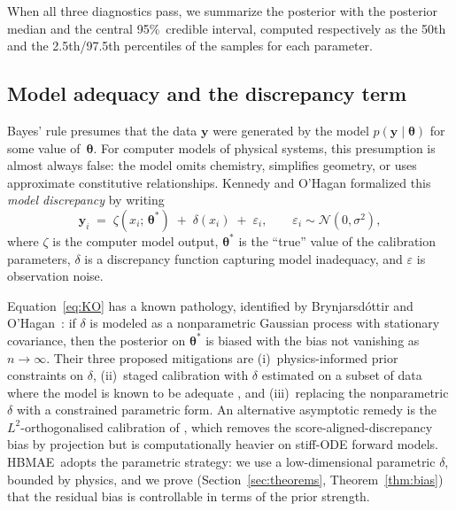 \documentclass[12pt]{article}
\theoremstyle{plain}
\theoremstyle{definition}
\theoremstyle{remark}
\newcommand{\HBMAE}{HBMAE\xspace}
\begin{document}
When all three diagnostics pass, we summarize the posterior with the
posterior median and the central 95\%~credible interval, computed
respectively as the 50th and the 2.5th/97.5th percentiles of the samples for
each parameter.

\subsection{Model adequacy and the discrepancy term}\label{sec:bg:adequacy}

Bayes' rule presumes that the data $\mathbf{y}$ were generated by the model
$p(\mathbf{y}\mid\boldsymbol{\theta})$ for some value of~$\boldsymbol{\theta}$.
For computer models of physical systems, this presumption is almost always
false:  the model omits chemistry, simplifies geometry, or uses approximate
constitutive relationships.  Kennedy and O'Hagan formalized this
\emph{model discrepancy} \citep{KennedyOHagan2001} by writing
%
\begin{equation}
  \mathbf{y}_i \;=\; \zeta(x_i;\,\boldsymbol{\theta}^*) \;+\;
              \delta(x_i) \;+\; \varepsilon_i,
  \qquad \varepsilon_i \sim \mathcal{N}(0,\sigma^2),
  \label{eq:KO}
\end{equation}
%
where $\zeta$ is the computer model output, $\boldsymbol{\theta}^*$ is the
``true'' value of the calibration parameters, $\delta$ is a discrepancy
function capturing model inadequacy, and $\varepsilon$ is observation noise.

Equation~\eqref{eq:KO} has a known pathology, identified by Brynjarsd\'ottir
and O'Hagan~\citep{Brynjarsdottir2014}:  if $\delta$ is modeled as a
nonparametric Gaussian process with stationary covariance, then the
posterior on $\boldsymbol{\theta}^*$ is biased with the bias not vanishing
as $n\to\infty$.  Their three proposed mitigations are (i)~physics-informed
prior constraints on $\delta$, (ii)~staged calibration with $\delta$
estimated on a subset of data where the model is known to be adequate
\citep{Vollmer2009,Plumlee2017}, and
(iii)~replacing the nonparametric $\delta$ with a constrained parametric
form.  An alternative asymptotic remedy is the $L^2$-orthogonalised
calibration of \citet{TuoWu2015,TuoWu2016}, which removes the
score-aligned-discrepancy bias by projection but is computationally
heavier on stiff-ODE forward models.  \HBMAE\ adopts the parametric
strategy: we use a low-dimensional parametric $\delta$, bounded by
physics, and we prove (Section~\ref{sec:theorems},
Theorem~\ref{thm:bias}) that the residual bias is controllable in terms
of the prior strength.
\end{document}
